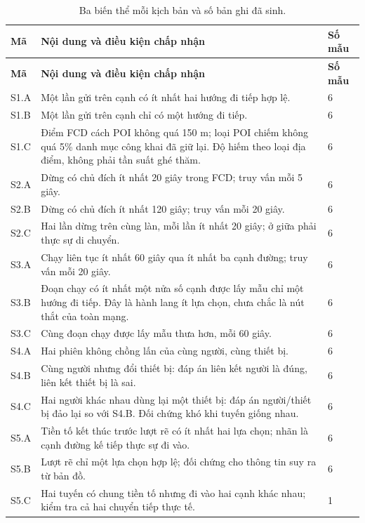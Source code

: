 \begingroup\small{}
\begin{longtable}{P{1.0cm}P{11.0cm}P{1.0cm}}
\caption{Ba biến thể mỗi kịch bản và số bản ghi đã sinh.}\label{tab:scenario-subcases}\\
\toprule\textbf{Mã} & \textbf{Nội dung và điều kiện chấp nhận} & \textbf{Số mẫu}\\\midrule\endfirsthead
\toprule\textbf{Mã} & \textbf{Nội dung và điều kiện chấp nhận} & \textbf{Số mẫu}\\\midrule\endhead
\bottomrule\endfoot
S1.A & Một lần gửi trên cạnh có ít nhất hai hướng đi tiếp hợp lệ. & 6\\
S1.B & Một lần gửi trên cạnh chỉ có một hướng đi tiếp. & 6\\
S1.C & Điểm FCD cách POI không quá 150 m; loại POI chiếm không quá 5\% danh mục công khai đã giữ lại. Độ hiếm theo loại địa điểm, không phải tần suất ghé thăm. & 6\\\midrule
S2.A & Dừng có chủ đích ít nhất 20 giây trong FCD; truy vấn mỗi 5 giây. & 6\\
S2.B & Dừng có chủ đích ít nhất 120 giây; truy vấn mỗi 20 giây. & 6\\
S2.C & Hai lần dừng trên cùng làn, mỗi lần ít nhất 20 giây; ở giữa phải thực sự di chuyển. & 6\\\midrule
S3.A & Chạy liên tục ít nhất 60 giây qua ít nhất ba cạnh đường; truy vấn mỗi 20 giây. & 6\\
S3.B & Đoạn chạy có ít nhất một nửa số cạnh được lấy mẫu chỉ một hướng đi tiếp. Đây là hành lang ít lựa chọn, chưa chắc là nút thắt của toàn mạng. & 6\\
S3.C & Cùng đoạn chạy được lấy mẫu thưa hơn, mỗi 60 giây. & 6\\\midrule
S4.A & Hai phiên không chồng lấn của cùng người, cùng thiết bị. & 6\\
S4.B & Cùng người nhưng đổi thiết bị: đáp án liên kết người là đúng, liên kết thiết bị là sai. & 6\\
S4.C & Hai người khác nhau dùng lại một thiết bị: đáp án người/thiết bị đảo lại so với S4.B. Đối chứng khó khi tuyến giống nhau. & 6\\\midrule
S5.A & Tiền tố kết thúc trước lượt rẽ có ít nhất hai lựa chọn; nhãn là cạnh đường kế tiếp thực sự đi vào. & 6\\
S5.B & Lượt rẽ chỉ một lựa chọn hợp lệ; đối chứng cho thông tin suy ra từ bản đồ. & 6\\
S5.C & Hai tuyến có chung tiền tố nhưng đi vào hai cạnh khác nhau; kiểm tra cả hai chuyển tiếp thực tế. & 1\\\midrule

\end{longtable}

